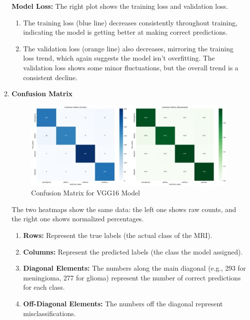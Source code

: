 \begin{enumerate}[label=\roman*.]
\textbf{Model Loss:} The right plot shows the training loss and validation loss.  
\begin{enumerate}[label=$\bullet$] 
    \item The training loss (blue line) decreases consistently throughout training, indicating the model is getting better at making correct predictions.
    \item The validation loss (orange line) also decreases, mirroring the training loss trend, which again suggests the model isn't overfitting. The validation loss shows some minor fluctuations, but the overall trend is a consistent decline.
\end{enumerate}

\item \textbf{Confusion Matrix}

\begin{figure}[H]
    \centering
    \includegraphics[width=1\linewidth]{Images/Metrices/confusion.png}
    \caption{Confusion Matrix for VGG16 Model}
    \label{fig:Confusion Matrix}
\end{figure}

The two heatmaps show the same data: the left one shows raw counts, and the right one shows normalized percentages.
\begin{enumerate}[label=$\bullet$] 

\item \textbf{Rows:} Represent the true labels (the actual class of the MRI).  

\item \textbf{Columns:} Represent the predicted labels (the class the model assigned).

\item \textbf{Diagonal Elements:} The numbers along the main diagonal (e.g., 293 for meningioma, 277 for glioma) represent the number of correct predictions for each class.

\item \textbf{Off-Diagonal Elements:} The numbers off the diagonal represent misclassifications.
\end{enumerate}


\end{enumerate}
